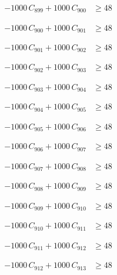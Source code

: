 \documentclass[a4paper,11pt]{article}
\begin{document}
\begin{align}
-1000\,C_{899} + 1000\,C_{900} &\geq 48 \nonumber
\end{align}

\begin{align}
-1000\,C_{900} + 1000\,C_{901} &\geq 48 \nonumber
\end{align}

\begin{align}
-1000\,C_{901} + 1000\,C_{902} &\geq 48 \nonumber
\end{align}

\begin{align}
-1000\,C_{902} + 1000\,C_{903} &\geq 48 \nonumber
\end{align}

\begin{align}
-1000\,C_{903} + 1000\,C_{904} &\geq 48 \nonumber
\end{align}

\begin{align}
-1000\,C_{904} + 1000\,C_{905} &\geq 48 \nonumber
\end{align}

\begin{align}
-1000\,C_{905} + 1000\,C_{906} &\geq 48 \nonumber
\end{align}

\begin{align}
-1000\,C_{906} + 1000\,C_{907} &\geq 48 \nonumber
\end{align}

\begin{align}
-1000\,C_{907} + 1000\,C_{908} &\geq 48 \nonumber
\end{align}

\begin{align}
-1000\,C_{908} + 1000\,C_{909} &\geq 48 \nonumber
\end{align}

\begin{align}
-1000\,C_{909} + 1000\,C_{910} &\geq 48 \nonumber
\end{align}

\begin{align}
-1000\,C_{910} + 1000\,C_{911} &\geq 48 \nonumber
\end{align}

\begin{align}
-1000\,C_{911} + 1000\,C_{912} &\geq 48 \nonumber
\end{align}

\begin{align}
-1000\,C_{912} + 1000\,C_{913} &\geq 48 \nonumber
\end{align}
\end{document}
